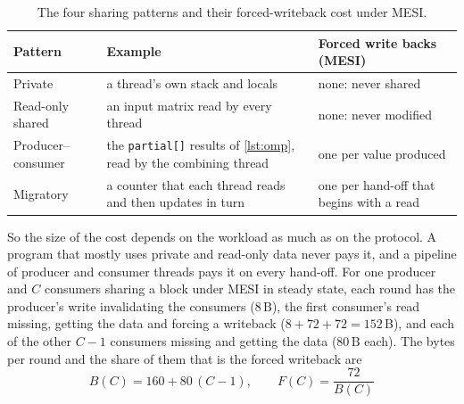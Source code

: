 \begin{table}[htbp]
\centering
\caption{The four sharing patterns and their forced-writeback cost under MESI.}
\label{tab:patterns}
\small
\begin{tabular}{@{}l p{4.6cm} p{4.4cm}@{}}
\toprule
Pattern & Example & Forced write backs (MESI) \\
\midrule
Private & a thread's own stack and locals & none: never shared \\
Read-only shared & an input matrix read by every thread & none: never modified \\
Producer--consumer & the \texttt{partial[]} results of \cref{lst:omp}, read
  by the combining thread & one per value produced \\
Migratory & a counter that each thread reads and then updates in turn &
  one per hand-off that begins with a read \\
\bottomrule
\end{tabular}
\end{table}

\label{sec:dirty-model}
So the size of the cost depends on the workload as much as on the protocol. A
program that mostly uses private and read-only data never pays it, and a pipeline
of producer and consumer threads pays it on every hand-off. For one producer and
$C$ consumers sharing a block under MESI in steady state, each round has the
producer's write invalidating the consumers (8\,B), the first consumer's read
missing, getting the data and forcing a writeback ($8+72+72=152$\,B), and each of
the other $C-1$ consumers missing and getting the data ($80$\,B each). The bytes
per round and the share of them that is the forced writeback are
\begin{equation}
  B(C) = 160 + 80\,(C-1), \qquad
  F(C) = \frac{72}{B(C)}
  \label{eq:pc-model}
\end{equation}

